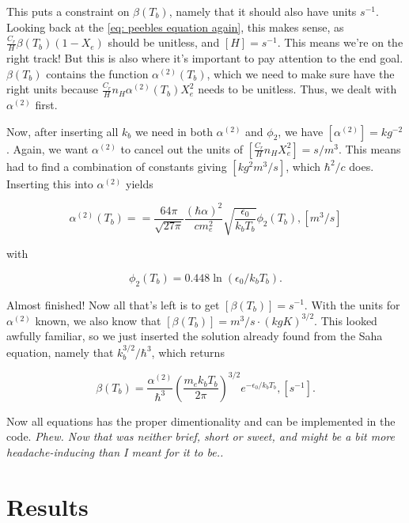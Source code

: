 \documentclass[12pt]{article}
\begin{document}
This puts a constraint on $\beta(T_b)$, namely that it should also have units $s^{-1}$. Looking back at the \cref{eq: peebles equation again}, this makes sense, as $\frac{C_r}{H}\beta(T_b)(1-X_e)$ should be unitless, and $[H] = s^{-1}$. This means we're on the right track! But this is also where it's important to pay attention to the end goal. $\beta(T_b)$ contains the function $\alpha^{(2)}(T_b)$, which we need to make sure have the right units because $\frac{C_r}{H}n_H\alpha^{(2)}(T_b)X_e^2$ needs to be unitless. Thus, we dealt with $\alpha^{(2)}$ first. 

Now, after inserting all $k_b$ we need in both $\alpha^{(2)}$ and $\phi_2$, we have $[\alpha^{(2)}] = kg^{-2}$. Again, we want $\alpha^{(2)}$ to cancel out the units of $[\frac{C_r}{H}n_HX_e^2] = s/m^3$. This means had to find a combination of constants giving $[kg^2m^3/s]$, which $\hbar^2/c$ does. Inserting this into $\alpha^{(2)}$ yields

\begin{equation*}
    \alpha^{(2)}(T_b) = =\frac{64 \pi}{\sqrt{27 \pi}} \frac{(\hbar\alpha)^{2}}{cm_{e}^{2}} \sqrt{\frac{\epsilon_{0}}{k_bT_{b}}} \phi_{2}\left(T_{b}\right), [m^3/s]
\end{equation*}

with

\begin{equation*}
    \phi_2(T_b) = 0.448\ln(\epsilon_0/k_b T_b).
\end{equation*}

Almost finished! Now all that's left is to get $[\beta(T_b)] = s^{-1}$. With the units for $\alpha^{(2)}$ known, we also know that $[\beta(T_b)] = m^3/s\cdot\left(kgK\right)^{3/2}$. This looked awfully familiar, so we just inserted the solution already found from the Saha equation, namely that $k_b^{3/2}/\hbar^3$, which returns

\begin{equation*}
    \beta(T_b) = \frac{\alpha^{(2)}}{\hbar^3} \left(\frac{m_e k_b T_b}{2\pi}\right)^{3/2} e^{-\epsilon_0/k_b T_b}, [s^{-1}].
\end{equation*}

Now all equations has the proper dimentionality and can be implemented in the code. \textit{Phew. Now that was neither brief, short or sweet, and might be a bit more headache-inducing than I meant for it to be..}
\section{Results}

{}

\end{document}
